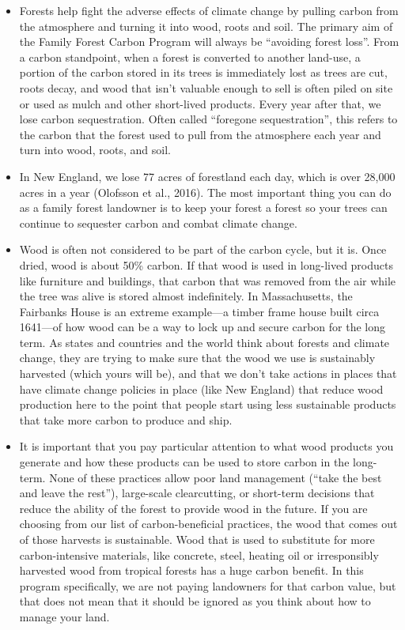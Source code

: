 \documentclass{article}\usepackage[]{graphicx}\usepackage[]{color}
\begin{document}
  \begin{itemize}
  \item Forests help fight the adverse effects of climate change by pulling carbon from the atmosphere and turning it into wood, roots and soil. The primary aim of the Family Forest Carbon Program will always be ``avoiding forest loss''. From a carbon standpoint, when a forest is converted to another land-use, a portion of the carbon stored in its trees is immediately lost as trees are cut, roots decay, and wood that isn't valuable enough to sell is often piled on site or used as mulch and other short-lived products. Every year after that, we lose carbon sequestration. Often called ``foregone sequestration'', this refers to the carbon that the forest used to pull from the atmosphere each year and turn into wood, roots, and soil.
  
  \item In New England, we lose 77 acres of forestland each day, which is over 28,000 acres in a year (Olofsson et al., 2016). The most important thing you can do as a family forest landowner is to keep your forest a forest so your trees can continue to sequester carbon and combat climate change.

  \item Wood is often not considered to be part of the carbon cycle, but it is. Once dried, wood is about 50\% carbon. If that wood is used in long-lived products like furniture and buildings, that carbon that was removed from the air while the tree was alive is stored almost indefinitely. In Massachusetts, the Fairbanks House is an extreme example---a timber frame house built circa 1641---of how wood can be a way to lock up and secure carbon for the long term. As states and countries and the world think about forests and climate change, they are trying to make sure that the wood we use is sustainably harvested (which yours will be), and that we don't take actions in places that have climate change policies in place (like New England) that reduce wood production here to the point that people start using less sustainable products that take more carbon to produce and ship.

  \item It is important that you pay particular attention to what wood products you generate and how these products can be used to store carbon in the long-term. None of these practices allow poor land management (``take the best and leave the rest''), large-scale clearcutting, or short-term decisions that reduce the ability of the forest to provide wood in the future. If you are choosing from our list of carbon-beneficial practices, the wood that comes out of those harvests is sustainable. Wood that is used to substitute for more carbon-intensive materials, like concrete, steel, heating oil or irresponsibly harvested wood from tropical forests has a huge carbon benefit. In this program specifically, we are not paying landowners for that carbon value, but that does not mean that it should be ignored as you think about how to manage your land.


\end{itemize}
\end{document}
